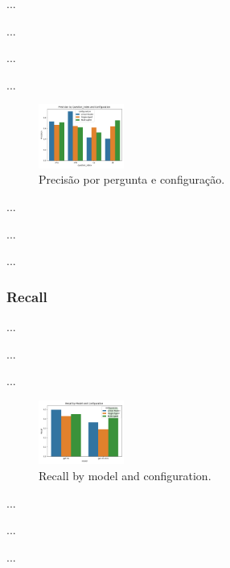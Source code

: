                 ...

                ...

                ...

                ...

                \begin{figure}[h!]
                    \centering              
                    \includegraphics[width=0.25\textwidth]{images_part_2/question_precision_question_index_configuration.png}
                    \caption{Precisão por pergunta e configuração.}
                    \label{fig:question_precision_question_index_configuration}
                \end{figure}    

                ...

                ...

                ...

            
            \subsubsection{Recall}
            
                ...

                ...

                ...
                
                \begin{figure}[h!]
                    \centering              
                    \includegraphics[width=0.25\textwidth]{images_part_2/model_recall_model_configuration.png}
                    \caption{Recall by model and configuration.}
                    \label{fig:model_recall_model_configuration}
                \end{figure}

                ...

                ...

                ...

